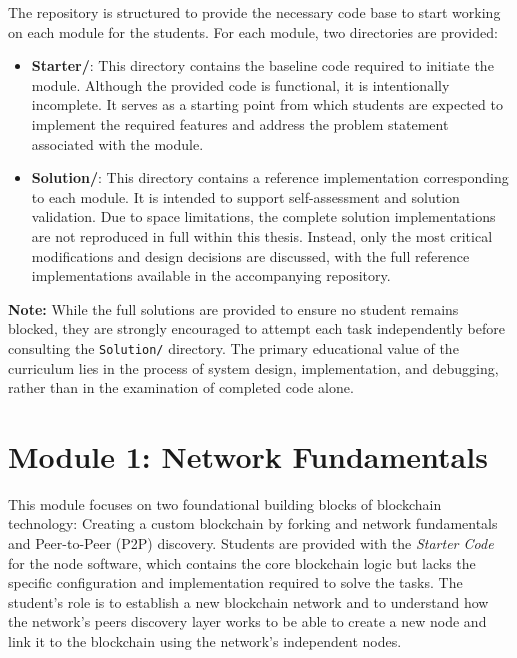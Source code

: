 The repository is structured to provide the necessary code base to start working on each module for the students. For each module, two directories are provided:
\begin{itemize}
    \item \textbf{Starter/}: This directory contains the baseline code required to initiate the module. Although the provided code is functional, it is intentionally incomplete. It serves as a starting point from which students are expected to implement the required features and address the problem statement associated with the module.

    \item \textbf{Solution/}: This directory contains a reference implementation corresponding to each module. It is intended to support self-assessment and solution validation. Due to space limitations, the complete solution implementations are not reproduced in full within this thesis. Instead, only the most critical modifications and design decisions are discussed, with the full reference implementations available in the accompanying repository.
\end{itemize}

\textbf{Note:} While the full solutions are provided to ensure no student remains blocked, they are strongly encouraged to attempt each task independently before consulting the \texttt{Solution/} directory. The primary educational value of the curriculum lies in the process of system design, implementation, and debugging, rather than in the examination of completed code alone.

\newpage

\section{Module 1: Network Fundamentals} \label{ch5_module1}

This module focuses on two foundational building blocks of blockchain technology: Creating a custom blockchain by forking and network fundamentals and Peer-to-Peer (P2P) discovery. Students are provided with the \textit{Starter Code} for the node software, which contains the core blockchain logic but lacks the specific configuration and implementation required to solve the tasks. The student's role is to establish a new blockchain network and to understand how the network's peers discovery layer works to be able to create a new node and link it to the blockchain using the network's independent nodes.

